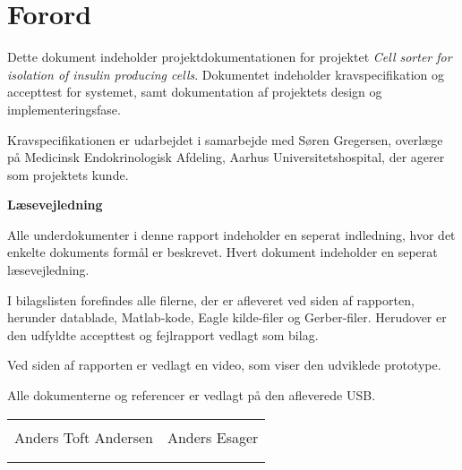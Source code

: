 \chapter*{Forord}

Dette dokument indeholder projektdokumentationen for projektet \textit{Cell sorter for isolation of insulin producing cells}. Dokumentet indeholder kravspecifikation og accepttest for systemet, samt dokumentation af projektets design og implementeringsfase. 

Kravspecifikationen er udarbejdet i samarbejde med Søren Gregersen, overlæge på Medicinsk Endokrinologisk Afdeling, Aarhus Universitetshospital, der agerer som projektets kunde. 

\textbf{Læsevejledning}

Alle underdokumenter i denne rapport indeholder en seperat indledning, hvor det enkelte dokuments formål er beskrevet. Hvert dokument indeholder en seperat læsevejledning. 

I bilagslisten forefindes alle filerne, der er afleveret ved siden af rapporten, herunder datablade, Matlab-kode, Eagle kilde-filer og Gerber-filer. Herudover er den udfyldte accepttest og fejlrapport vedlagt som bilag.

Ved siden af rapporten er vedlagt en video, som viser den udviklede prototype.


Alle dokumenterne og referencer er vedlagt på den afleverede USB.

\phantom{Luft}

\phantom{Luft}

\begin{table}[H]
	\centering
		\begin{tabular}{c c}
			\underline{\phantom{mmmmmmmmmmmmmm}} & \underline{\phantom{mmmmmmmmmmmmmm}}  \\
			Anders Toft Andersen			& Anders Esager		 			\\
			&\\
			&\\

		 																									
		\end{tabular}
\end{table}